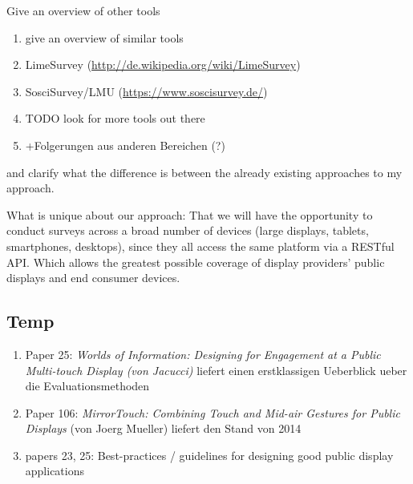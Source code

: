 	Give an overview of other tools 

	\begin{enumerate}
	\item give an overview of similar tools
	\item LimeSurvey (\url{http://de.wikipedia.org/wiki/LimeSurvey})
	\item SosciSurvey/LMU (\url{https://www.soscisurvey.de/})
	\item TODO look for more tools out there
	\item +Folgerungen aus anderen Bereichen (?)
	\end{enumerate}

	and clarify what the difference is between the already existing approaches to my approach.





What is unique about our approach: That we will have the opportunity to conduct surveys across a broad number of devices (large displays, tablets, smartphones, desktops), since they all access the same platform via a RESTful API. Which allows the greatest possible coverage of display providers' public displays and end consumer devices.







\subsection{Temp}

	\begin{enumerate}
	\item Paper 25: \textit{Worlds of Information: Designing for Engagement at a Public Multi-touch Display (von Jacucci)} liefert einen erstklassigen Ueberblick ueber die Evaluationsmethoden
	\item Paper 106: \textit{MirrorTouch: Combining Touch and Mid-air Gestures for Public Displays} (von Joerg Mueller) liefert den Stand von 2014

	\item papers 23, 25: Best-practices / guidelines for designing good public display applications
	\end{enumerate}

